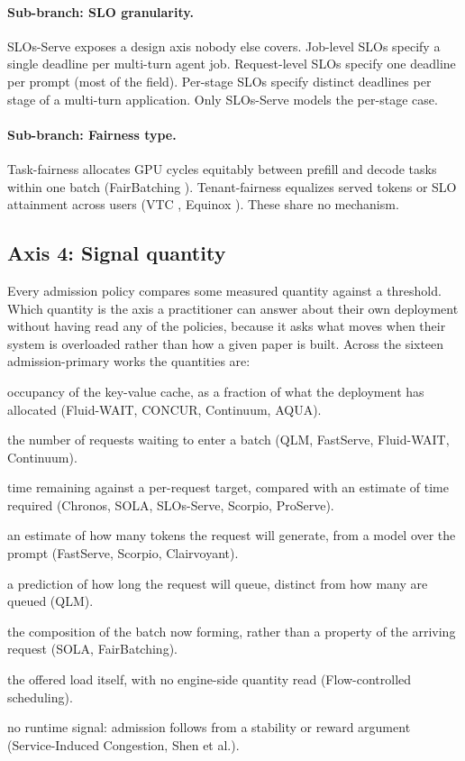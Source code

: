 \paragraph{Sub-branch: SLO granularity.}
SLOs-Serve \citep{chen2025slosserve} exposes a design axis nobody else
covers. Job-level SLOs specify a single deadline per multi-turn agent
job. Request-level SLOs specify one deadline per prompt (most of the
field). Per-stage SLOs specify distinct deadlines per stage of a
multi-turn application. Only SLOs-Serve models the per-stage case.

\paragraph{Sub-branch: Fairness type.}
Task-fairness allocates GPU cycles equitably between prefill and
decode tasks within one batch (FairBatching
\citep{lyu2025fairbatching}). Tenant-fairness equalizes served tokens
or SLO attainment across users (VTC \citep{sheng2024vtc}, Equinox
\citep{wei2025equinox}). These share no mechanism.

\subsection{Axis 4: Signal quantity}
\label{sec:axis-signal}

Every admission policy compares some measured quantity against a
threshold. Which quantity is the axis a practitioner can answer about
their own deployment without having read any of the policies, because it
asks what moves when their system is overloaded rather than how a given
paper is built. Across the sixteen admission-primary works the
quantities are:

\begin{description}[leftmargin=2em, itemsep=1pt]
\item[KV pressure] occupancy of the key-value cache, as a fraction of
      what the deployment has allocated (Fluid-WAIT, CONCUR, Continuum,
      AQUA).
\item[Queue depth] the number of requests waiting to enter a batch
      (QLM, FastServe, Fluid-WAIT, Continuum).
\item[Deadline slack] time remaining against a per-request target,
      compared with an estimate of time required (Chronos, SOLA,
      SLOs-Serve, Scorpio, ProServe).
\item[Predicted length] an estimate of how many tokens the request will
      generate, from a model over the prompt (FastServe, Scorpio,
      Clairvoyant).
\item[Wait estimate] a prediction of how long the request will queue,
      distinct from how many are queued (QLM).
\item[Batch state] the composition of the batch now forming, rather
      than a property of the arriving request (SOLA, FairBatching).
\item[Arrival rate] the offered load itself, with no engine-side
      quantity read (Flow-controlled scheduling).
\item[Analytic] no runtime signal: admission follows from a stability
      or reward argument (Service-Induced Congestion, Shen et al.).
\end{description}

